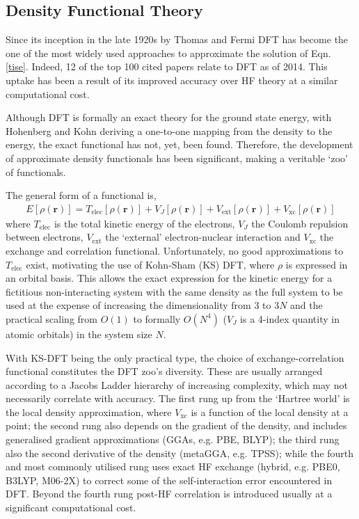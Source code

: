 \documentclass[main.tex]{subfiles}
\begin{document}
\subsection{Density Functional Theory}

Since its inception in the late 1920s by Thomas\cite{Thomas1927} and Fermi\cite{Fermi1928} DFT has become the one of the most widely used approaches to approximate the solution of Eqn. \eqref{tise}.\cite{Haunschild2019} Indeed, 12 of the top 100 cited papers relate to DFT as of 2014.\cite{VanNoorden2014} This uptake has been a result of its improved accuracy over HF theory at a similar computational cost.

Although DFT is formally an exact theory for the ground state energy, with Hohenberg and Kohn deriving a one-to-one mapping from the density to the energy,\cite{HohenbergKohn1964} the exact functional has not, yet, been found.\cite{Kanungo2019} Therefore, the development of approximate density functionals has been significant, making a veritable `zoo' of functionals.\cite{Mardirossian2017, Goerigk2017}

The general form of a functional is,
\begin{eqnarray}
E[\rho(\boldsymbol{r})] = T_\text{elec}[\rho(\boldsymbol{r})]  + V_{J}[\rho(\boldsymbol{r})] + V_\text{ext}[\rho(\boldsymbol{r})] + V_\text{xc}[\rho(\boldsymbol{r})] 
\end{eqnarray}
where $T_\text{elec}$ is the total kinetic energy of the electrons, $V_{J}$ the Coulomb repulsion between electrons, $V_\text{ext}$ the `external' electron-nuclear interaction and $V_\text{xc}$ the exchange and correlation functional. Unfortunately, no good approximations to $T_\text{elec}$ exist,\cite{OFDFT2009} motivating the use of Kohn-Sham (KS) DFT, where $\rho$ is expressed in an orbital basis.\cite{KS1965} This allows the exact expression for the kinetic energy for a fictitious non-interacting system with the same density as the full system to be used at the expense of increasing the dimensionality from 3 to 3$N$ and the practical scaling from $O(1)$ to formally $O(N^4)$ ($V_J$ is a 4-index quantity in atomic orbitals) in the system size $N$.\cite{Lignres2005}

With KS-DFT being the only practical type, the choice of exchange-correlation functional constitutes the DFT zoo's diversity. These are usually arranged according to a Jacobs Ladder hierarchy of increasing complexity, which may not necessarily correlate with accuracy.\cite{Perdew2001} The first rung up from the `Hartree world' is the local density approximation, where $V_\text{xc}$ is a function of the local density at a point; the second rung also depends on the gradient of the density, and includes generalised gradient approximations (GGAs, e.g. PBE,\cite{Perdew1996} BLYP\cite{BLYP_B_1988, LYP_1988}); the third rung also the second derivative of the density (metaGGA, e.g. TPSS\cite{TPSS}); while the fourth and most commonly utilised rung uses exact HF exchange (hybrid, e.g. PBE0,\cite{Adamo1999} B3LYP,\cite{Stephens1994, Becke1993} M06-2X\cite{Zhao2007}) to correct some of the self-interaction error encountered in DFT. Beyond the fourth rung post-HF correlation is introduced usually at a significant computational cost.
\end{document}

